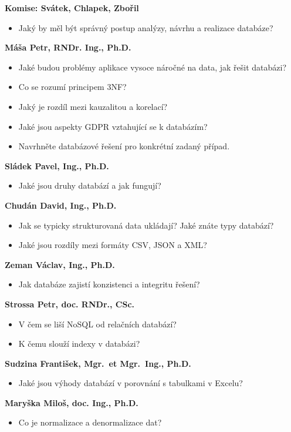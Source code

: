 \begin{profesorbox}
\textbf{Komise: Svátek, Chlapek, Zbořil}
\begin{itemize}
  \item Jaký by měl být správný postup analýzy, návrhu a realizace databáze?
\end{itemize}
\textbf{Máša Petr, RNDr. Ing., Ph.D.}
\begin{itemize}
  \item Jaké budou problémy aplikace vysoce náročné na data, jak řešit databázi?
  \item Co se rozumí principem 3NF?
  \item Jaký je rozdíl mezi kauzalitou a korelací?
  \item Jaké jsou aspekty GDPR vztahující se k databázím?
  \item Navrhněte databázové řešení pro konkrétní zadaný případ.
\end{itemize}
\textbf{Sládek Pavel, Ing., Ph.D.}
\begin{itemize}
  \item Jaké jsou druhy databází a jak fungují?
\end{itemize}
\textbf{Chudán David, Ing., Ph.D.}
\begin{itemize}
  \item Jak se typicky strukturovaná data ukládají? Jaké znáte typy databází?
  \item Jaké jsou rozdíly mezi formáty CSV, JSON a XML?
\end{itemize}
\textbf{Zeman Václav, Ing., Ph.D.}
\begin{itemize}
  \item Jak databáze zajistí konzistenci a integritu řešení?
\end{itemize}
\textbf{Strossa Petr, doc. RNDr., CSc.}
\begin{itemize}
  \item V čem se liší NoSQL od relačních databází?
  \item K čemu slouží indexy v databázi?
\end{itemize}
\textbf{Sudzina František, Mgr.\ et Mgr.\ Ing., Ph.D.}
\begin{itemize}
  \item Jaké jsou výhody databází v porovnání s tabulkami v Excelu?
\end{itemize}
\textbf{Maryška Miloš, doc. Ing., Ph.D.}
\begin{itemize}
  \item Co je normalizace a denormalizace dat?
\end{itemize}
\end{profesorbox}

